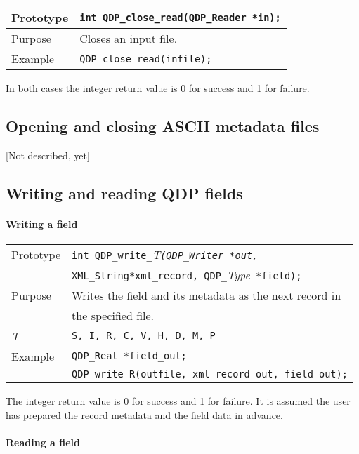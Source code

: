 \documentclass{article}
\newcommand{\allTypes}{{\tt S, I, R, C, V, H, D, M, P}}
\newcommand{\itt}{\it T}
\newcommand{\QMDhandle}{{\tt XML\_String}}
\begin{document}
\begin{flushleft}
  \begin{tabular}{|l|l|}
  \hline
  Prototype      & \verb|int QDP_close_read(QDP_Reader *in);| \\
    \hline
  Purpose        & Closes an input file. \\
\hline
  Example        & \verb|QDP_close_read(infile);|\\
   \hline
 \end{tabular}
\end{flushleft}
%
In both cases the integer return value is 0 for success and 1 for failure.

\subsection{Opening and closing ASCII metadata files}
[Not described, yet]

\subsection{Writing and reading QDP fields}

\paragraph{Writing a field}

\begin{flushleft}
  \begin{tabular}{|l|l|}
  \hline
  Prototype      & \verb|int QDP_write_|\itt\verb|(QDP_Writer *out,|\\
                 &  \QMDhandle \verb|*xml_record, QDP_|{\it Type}\verb| *field);|\\
    \hline
  Purpose        & Writes the field and its metadata as the next record in \\
                 & the specified file. \\
\hline
  \itt     & \allTypes \\
   \hline
  Example  & \verb|QDP_Real *field_out;| \\
           & \verb|QDP_write_R(outfile, xml_record_out, field_out);| \\
   \hline
 \end{tabular}
\end{flushleft}
%
The integer return value is 0 for success and 1 for failure.  It is
assumed the user has prepared the record metadata and the field data
in advance.

\paragraph{Reading a field}
\end{document}
